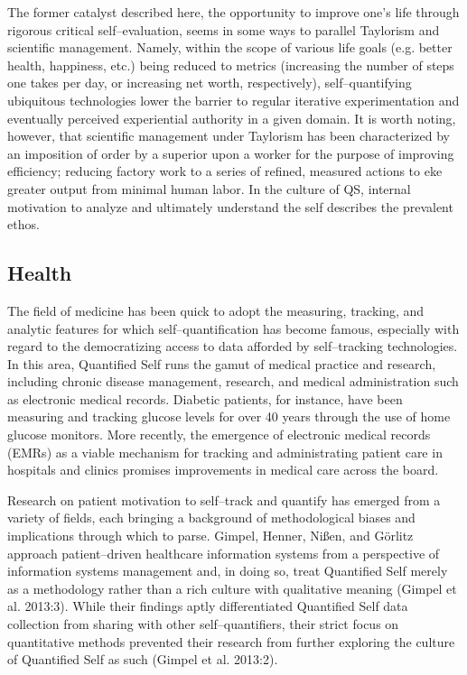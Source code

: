 \documentclass{article}
\begin{document}
The former catalyst described here,
the opportunity to improve one's life through rigorous critical self--evaluation,
seems in some ways to parallel Taylorism and scientific management.
Namely,
within the scope of various life goals (e.g.
better health,
happiness,
etc.) being reduced to metrics (increasing the number of steps one takes per day,
or increasing net worth,
respectively),
self--quantifying ubiquitous technologies lower the barrier to regular iterative experimentation and eventually perceived experiential authority in a given domain.
It is worth noting,
however,
that scientific management under Taylorism has been characterized by an imposition of order by a superior upon a worker for the purpose of improving efficiency;
reducing factory work to a series of refined,
measured actions to eke greater output from minimal human labor.
In the culture of QS,
internal motivation to analyze and ultimately understand the self describes the prevalent ethos.

\subsection*{Health}
The field of medicine has been quick to adopt the measuring,
tracking,
and analytic features for which self--quantification has become famous,
especially with regard to the democratizing access to data afforded by self--tracking technologies.
In this area,
Quantified Self runs the gamut of medical practice and research,
including chronic disease management,
research,
and medical administration such as electronic medical records.
Diabetic patients,
for instance,
have been measuring and tracking glucose levels for over 40 years through the use of home glucose monitors.
More recently,
the emergence of electronic medical records (EMRs) as a viable mechanism for tracking and administrating patient care in  hospitals and clinics promises improvements in medical care across the board.

Research on patient motivation to self--track and quantify has emerged from a variety of fields,
each bringing a background of methodological biases and implications through which to parse.
Gimpel,
Henner,
Nißen,
and Görlitz approach patient--driven healthcare information systems from a perspective of information systems management and,
in doing so,
treat Quantified Self merely as a methodology rather than a rich culture with qualitative meaning (Gimpel et al.
2013:3).
While their findings aptly differentiated Quantified Self data collection from sharing with other self--quantifiers,
their strict focus on quantitative methods prevented their research from further exploring the culture of Quantified Self as such (Gimpel et al.
2013:2).
\end{document}
